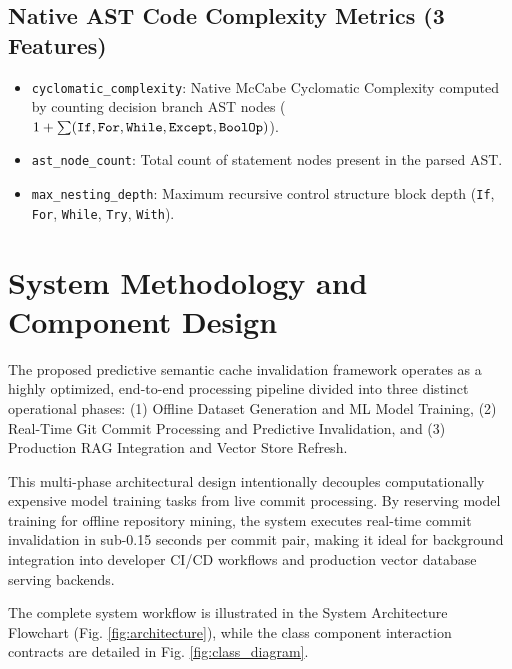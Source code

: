 \documentclass[conference]{IEEEtran}
\begin{document}
\subsection{Native AST Code Complexity Metrics (3 Features)}
\begin{itemize}
    \item \texttt{cyclomatic\_complexity}: Native McCabe Cyclomatic Complexity computed by counting decision branch AST nodes ($1 + \sum (\text{\texttt{If}}, \text{\texttt{For}}, \text{\texttt{While}}, \text{\texttt{Except}}, \text{\texttt{BoolOp}} )$).
    \item \texttt{ast\_node\_count}: Total count of statement nodes present in the parsed AST.
    \item \texttt{max\_nesting\_depth}: Maximum recursive control structure block depth (\texttt{If}, \texttt{For}, \texttt{While}, \texttt{Try}, \texttt{With}).
\end{itemize}

\section{System Methodology and Component Design}

The proposed predictive semantic cache invalidation framework operates as a highly optimized, end-to-end processing pipeline divided into three distinct operational phases: (1) Offline Dataset Generation and ML Model Training, (2) Real-Time Git Commit Processing and Predictive Invalidation, and (3) Production RAG Integration and Vector Store Refresh. 

This multi-phase architectural design intentionally decouples computationally expensive model training tasks from live commit processing. By reserving model training for offline repository mining, the system executes real-time commit invalidation in sub-0.15 seconds per commit pair, making it ideal for background integration into developer CI/CD workflows and production vector database serving backends.

The complete system workflow is illustrated in the System Architecture Flowchart (Fig. \ref{fig:architecture}), while the class component interaction contracts are detailed in Fig. \ref{fig:class_diagram}.
\end{document}

